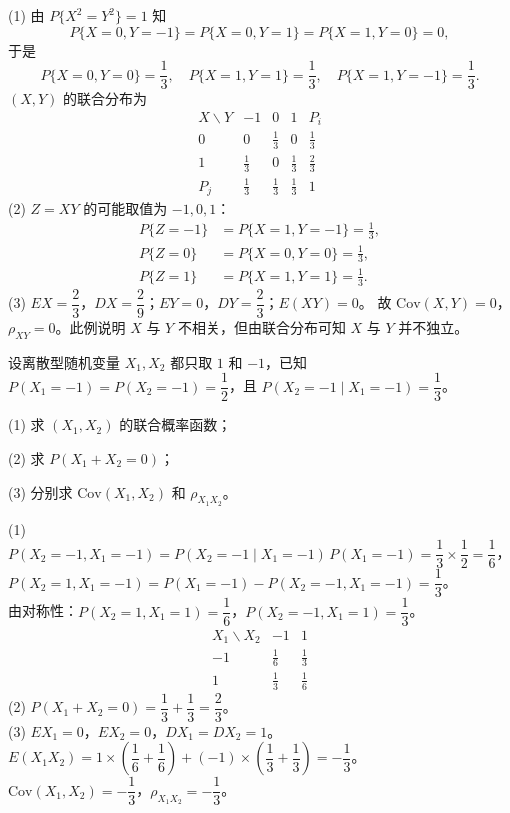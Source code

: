 ﻿\documentclass[lang=cn,11pt]{elegantbook}
\begin{document}
\begin{solution}
(1) 由 \(P\{X^2 = Y^2\} = 1\) 知
\[
P\{X=0,Y=-1\} = P\{X=0,Y=1\} = P\{X=1,Y=0\} = 0,
\]
于是
\[
P\{X=0,Y=0\} = \frac{1}{3},\quad
P\{X=1,Y=1\} = \frac{1}{3},\quad
P\{X=1,Y=-1\} = \frac{1}{3}.
\]
\((X,Y)\) 的联合分布为
\[
\begin{array}{c|ccc|c}
X \backslash Y & -1 & 0 & 1 & P_i \\
\hline
0 & 0 & \frac{1}{3} & 0 & \frac{1}{3} \\[4pt]
1 & \frac{1}{3} & 0 & \frac{1}{3} & \frac{2}{3} \\
\hline
P_j & \frac{1}{3} & \frac{1}{3} & \frac{1}{3} & 1
\end{array}
\]
(2) \(Z = XY\) 的可能取值为 \(-1, 0, 1\)：
\begin{align*}
    P\{Z=-1\} &= P\{X=1,Y=-1\} = \frac{1}{3},\\
    P\{Z=0\} &= P\{X=0,Y=0\} = \frac{1}{3},\\
    P\{Z=1\} &= P\{X=1,Y=1\} = \frac{1}{3}.
\end{align*}
(3) \(EX = \dfrac{2}{3}\)，\(DX = \dfrac{2}{9}\)；\(EY = 0\)，\(DY = \dfrac{2}{3}\)；\(E(XY) = 0\)。
故 \(\mathrm{Cov}(X,Y) = 0\)，\(\rho_{XY} = 0\)。此例说明 \(X\) 与 \(Y\) 不相关，但由联合分布可知 \(X\) 与 \(Y\) 并不独立。
\end{solution}

\begin{exercise}\label{exer:4-2-pm1}
设离散型随机变量 \(X_1, X_2\) 都只取 \(1\) 和 \(-1\)，已知 \(P(X_1 = -1) = P(X_2 = -1) = \dfrac{1}{2}\)，且 \(P(X_2 = -1 \mid X_1 = -1) = \dfrac{1}{3}\)。\par
(1) 求 \((X_1, X_2)\) 的联合概率函数；\par
(2) 求 \(P(X_1 + X_2 = 0)\)；\par
(3) 分别求 \(\mathrm{Cov}(X_1, X_2)\) 和 \(\rho_{X_1X_2}\)。
\end{exercise}
\begin{solution}
(1) \(P(X_2=-1,X_1=-1) = P(X_2=-1 \mid X_1=-1)\,P(X_1=-1) = \dfrac{1}{3} \times \dfrac{1}{2} = \dfrac{1}{6}\)，\\
\(P(X_2=1,X_1=-1) = P(X_1=-1) - P(X_2=-1,X_1=-1) = \dfrac{1}{3}\)。\\
由对称性：\(P(X_2=1,X_1=1) = \dfrac{1}{6}\)，\(P(X_2=-1,X_1=1) = \dfrac{1}{3}\)。
\[
\begin{array}{c|cc}
X_1 \backslash X_2 & -1 & 1 \\
\hline
-1 & \frac{1}{6} & \frac{1}{3} \\[4pt]
1 & \frac{1}{3} & \frac{1}{6}
\end{array}
\]
(2) \(P(X_1+X_2=0) = \dfrac{1}{3} + \dfrac{1}{3} = \dfrac{2}{3}\)。\\
(3) \(EX_1 = 0\)，\(EX_2 = 0\)，\(DX_1 = DX_2 = 1\)。\(E(X_1 X_2) = 1 \times \left(\dfrac{1}{6}+\dfrac{1}{6}\right) + (-1) \times \left(\dfrac{1}{3}+\dfrac{1}{3}\right) = -\dfrac{1}{3}\)。\\
\(\mathrm{Cov}(X_1,X_2) = -\dfrac{1}{3}\)，\(\rho_{X_1X_2} = -\dfrac{1}{3}\)。
\end{solution}
\end{document}

